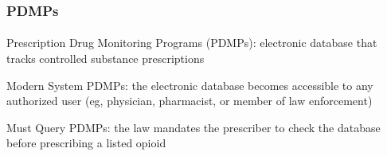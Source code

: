 \begin{frame}

    \frametitle{PDMPs} %
    \framesubtitle{}  %
    \rmfamily %
    
    Prescription Drug Monitoring Programs (\textcolor{fblu}{PDMPs}): electronic database that tracks controlled substance prescriptions
    \vspace{9pt}
    
    \begin{wideitemize}
        \item \textcolor{fblu}{Modern System PDMPs}: the electronic database becomes accessible to any authorized user (eg, physician, pharmacist, or member of law enforcement)
        \item \textcolor{fblu}{Must Query PDMPs}: the law mandates the prescriber to check the database before prescribing a listed opioid
    \end{wideitemize}
    
\end{frame}
